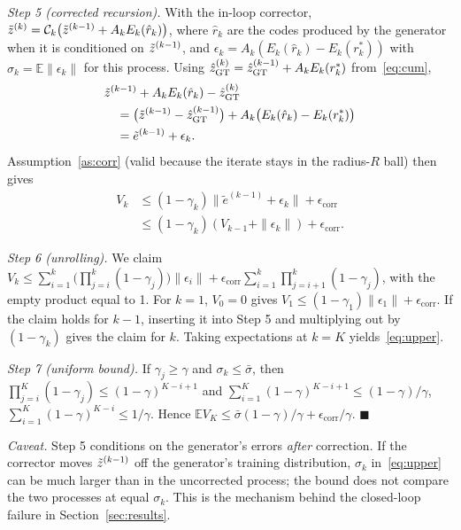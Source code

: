 \textit{Step 5 (corrected recursion).} With the in-loop corrector, $\tilde{z}^{(k)}=\mathcal{C}_k\big(\tilde{z}^{(k-1)}+A_kE_k(\hat r_k)\big)$, where $\hat r_k$ are the codes produced by the generator when it is conditioned on $\tilde{z}^{(k-1)}$, and $\epsilon_k=A_k(E_k(\hat r_k)-E_k(r^\ast_k))$ with $\sigma_k=\mathbb{E}\|\epsilon_k\|$ for this process. Using $\hat{z}^{(k)}_{\mathrm{GT}}=\hat{z}^{(k-1)}_{\mathrm{GT}}+A_kE_k(r^\ast_k)$ from~\eqref{eq:cum},
\begin{align}
&\tilde{z}^{(k-1)}+A_kE_k(\hat r_k)-\hat{z}^{(k)}_{\mathrm{GT}}\nonumber\\
&\quad=\big(\tilde{z}^{(k-1)}-\hat{z}^{(k-1)}_{\mathrm{GT}}\big)+A_k\big(E_k(\hat r_k)-E_k(r^\ast_k)\big)\nonumber\\
&\quad=\tilde e^{(k-1)}+\epsilon_k.
\end{align}
Assumption~\ref{as:corr} (valid because the iterate stays in the radius-$R$ ball) then gives
\begin{align}
V_k&\le(1-\gamma_k)\|\tilde e^{(k-1)}+\epsilon_k\|+\epsilon_{\mathrm{corr}}\nonumber\\
&\le(1-\gamma_k)(V_{k-1}+\|\epsilon_k\|)+\epsilon_{\mathrm{corr}}.
\end{align}

\textit{Step 6 (unrolling).} We claim $V_k\le\sum_{i=1}^{k}\big(\prod_{j=i}^{k}(1-\gamma_j)\big)\|\epsilon_i\|+\epsilon_{\mathrm{corr}}\sum_{i=1}^{k}\prod_{j=i+1}^{k}(1-\gamma_j)$, with the empty product equal to 1. For $k=1$, $V_0=0$ gives $V_1\le(1-\gamma_1)\|\epsilon_1\|+\epsilon_{\mathrm{corr}}$. If the claim holds for $k-1$, inserting it into Step 5 and multiplying out by $(1-\gamma_k)$ gives the claim for $k$. Taking expectations at $k=K$ yields~\eqref{eq:upper}.

\textit{Step 7 (uniform bound).} If $\gamma_j\ge\gamma$ and $\sigma_k\le\bar\sigma$, then $\prod_{j=i}^{K}(1-\gamma_j)\le(1-\gamma)^{K-i+1}$ and $\sum_{i=1}^{K}(1-\gamma)^{K-i+1}\le(1-\gamma)/\gamma$, $\sum_{i=1}^{K}(1-\gamma)^{K-i}\le1/\gamma$. Hence $\mathbb{E}V_K\le\bar\sigma(1-\gamma)/\gamma+\epsilon_{\mathrm{corr}}/\gamma$. \hfill$\blacksquare$

\textit{Caveat.} Step 5 conditions on the generator's errors \emph{after} correction. If the corrector moves $\tilde{z}^{(k-1)}$ off the generator's training distribution, $\sigma_k$ in~\eqref{eq:upper} can be much larger than in the uncorrected process; the bound does not compare the two processes at equal $\sigma_k$. This is the mechanism behind the closed-loop failure in Section~\ref{sec:results}.

